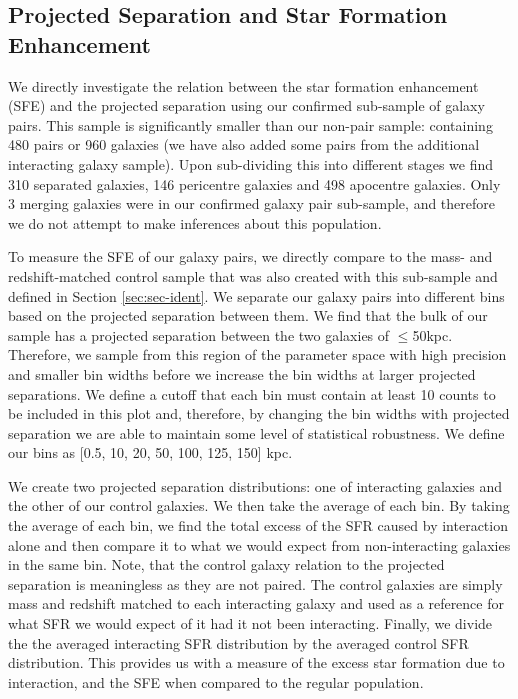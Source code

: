 \subsection{Projected Separation and Star Formation Enhancement}
\noindent We directly investigate the relation between the star formation enhancement (SFE) and the projected separation using our confirmed sub-sample of galaxy pairs. This sample is significantly smaller than our non-pair sample: containing 480 pairs or 960 galaxies (we have also added some pairs from the additional interacting galaxy sample). Upon sub-dividing this into different stages we find 310 separated galaxies, 146 pericentre galaxies and 498 apocentre galaxies. Only 3 merging galaxies were in our confirmed galaxy pair sub-sample, and therefore we do not attempt to make inferences about this population. 

To measure the SFE of our galaxy pairs, we directly compare to the mass- and redshift-matched control sample that was also created with this sub-sample and defined in Section \ref{sec:sec-ident}. We separate our galaxy pairs into different bins based on the projected separation between them. We find that the bulk of our sample has a projected separation between the two galaxies of $\leq$50kpc. Therefore, we sample from this region of the parameter space with high precision and smaller bin widths before we increase the bin widths at larger projected separations. We define a cutoff that each bin must contain at least 10 counts to be included in this plot and, therefore, by changing the bin widths with projected separation we are able to maintain some level of statistical robustness. We define our bins as [0.5, 10, 20, 50, 100, 125, 150] kpc.

We create two projected separation distributions: one of interacting galaxies and the other of our control galaxies. We then take the average of each bin. By taking the average of each bin, we find the total excess of the SFR caused by interaction alone and then compare it to what we would expect from non-interacting galaxies in the same bin. Note, that the control galaxy relation to the projected separation is meaningless as they are not paired. The control galaxies are simply mass and redshift matched to each interacting galaxy and used as a reference for what SFR we would expect of it had it not been interacting. Finally, we divide the the averaged interacting SFR distribution by the averaged control SFR distribution. This provides us with a measure of the excess star formation due to interaction, and the SFE when compared to the regular population.

